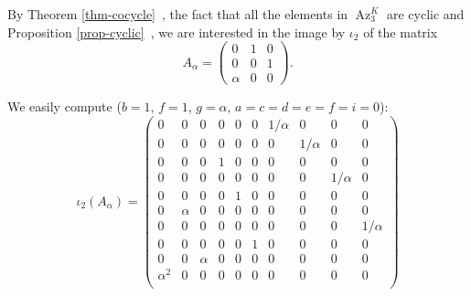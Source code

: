 \documentclass[a4paper,10pt]{amsart}
\theoremstyle{plain}
\theoremstyle{definition}
\theoremstyle{remark}
\numberwithin{equation}{section}
\begin{document}
By Theorem \ref{thm-cocycle}~, the fact that all the elements in $\operatorname{Az}_3^K$ are cyclic and Proposition \ref{prop-cyclic}~, we are interested in the image by $\iota_2$ of the matrix
$$
A_{\alpha}=\begin{pmatrix}
0 & 1 & 0 \\ 0 & 0 & 1 \\ \alpha & 0 & 0
\end{pmatrix}.
$$

We easily compute ($b=1$, $f=1$, $g=\alpha$, $a=c=d=e=f=i=0$):
\small
	$$
	\iota_2(A_{\alpha})=\begin{pmatrix}
	0 & 0 & 0 & 0 & 0 & 0 & 1/\alpha & 0 & 0 & 0 \\
	0 & 0 & 0 & 0 & 0 & 0 & 0 & 1/\alpha & 0 & 0 \\
	0 & 0 & 0 & 1 & 0 & 0 & 0 & 0 & 0 & 0 \\
	0 & 0 & 0 & 0 & 0 & 0 & 0 & 0 & 1/\alpha & 0 \\
	0 & 0 & 0 & 0 & 1 & 0 & 0 & 0 & 0 & 0 \\
	0 & \alpha & 0 & 0 & 0 & 0 & 0 & 0 & 0 & 0 \\
	0 & 0 & 0 & 0 & 0 & 0 & 0 & 0 & 0 & 1/\alpha \\
	0 & 0 & 0 & 0 & 0 & 1 & 0 & 0 & 0 & 0 \\
	0 & 0 & \alpha & 0 & 0 & 0 & 0 & 0 & 0 & 0 \\
	\alpha^2 & 0 & 0 & 0 & 0 & 0 & 0 & 0 & 0 & 0 \\
	\end{pmatrix}
	$$
\normalsize
\end{document}
